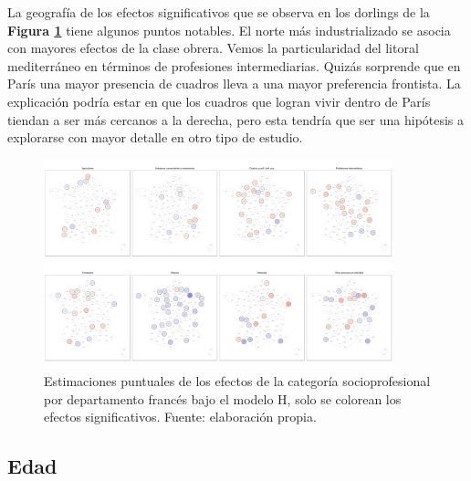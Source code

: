 La geografía de los efectos significativos que se observa en los dorlings de la \textbf{Figura \ref{fig:Dorling_Efectos_Cat_Socioprof}} tiene algunos puntos notables. El norte más industrializado se asocia con mayores efectos de la clase obrera. Vemos la particularidad del litoral mediterráneo en términos de profesiones intermediarias. Quizás sorprende que en París una mayor presencia de cuadros lleva a una mayor preferencia frontista. La explicación podría estar en que los cuadros que logran vivir dentro de París tiendan a ser más cercanos a la derecha, pero esta tendría que ser una hipótesis a explorarse con mayor detalle en otro tipo de estudio.\\ 

\begin{figure}[h]
	\centering
	\includegraphics[width = 0.9\textwidth]{Figs/Efectos/Dorling_Efectos_Cat_Socioprof_Modelo_H}
	\caption{Estimaciones puntuales de los efectos de la categoría socioprofesional por departamento francés bajo el modelo H, solo se colorean los efectos significativos. Fuente: elaboración propia.}
	\label{fig:Dorling_Efectos_Cat_Socioprof}
\end{figure}

\subsection{Edad}

